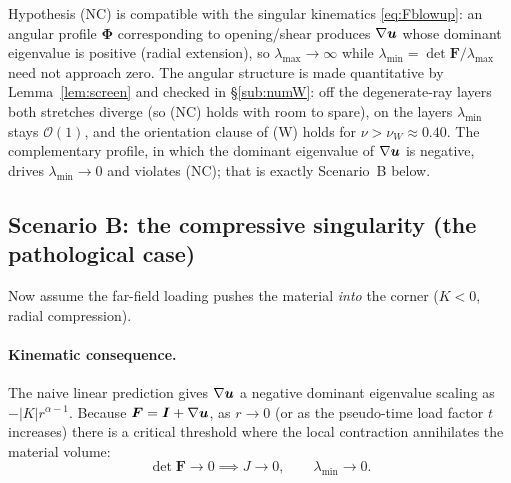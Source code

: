 \begin{remark}
    Hypothesis (NC) is compatible with the singular kinematics \eqref{eq:Fblowup}: an angular profile $\bm{\Phi}$
    corresponding to opening/shear produces $\nabla\bm{u}$ whose dominant eigenvalue is positive (radial extension), so
    $\lambda_{\max}\to\infty$ while $\lambda_{\min}=\det\bm{F}/\lambda_{\max}$ need not approach zero. The angular
    structure is made quantitative by Lemma~\ref{lem:screen} and checked in \S\ref{sub:numW}: off the degenerate-ray
    layers both stretches diverge (so (NC) holds with room to spare), on the layers $\lambda_{\min}$ stays
    $\mathcal{O}(1)$, and the orientation clause of (W) holds for $\nu>\nu_W\approx0.40$. The complementary
    profile, in which the dominant eigenvalue of $\nabla\bm{u}$ is negative, drives $\lambda_{\min}\to0$ and violates
    (NC); that is exactly Scenario~B below.
\end{remark}

\subsection{Scenario B: the compressive singularity (the pathological case)}
\label{sub:scenarioB}

Now assume the far-field loading pushes the material \emph{into} the corner ($K < 0$, radial compression).

\paragraph{Kinematic consequence.}
The naive linear prediction gives $\nabla\bm{u}$ a negative dominant eigenvalue scaling as $-|K| r^{\alpha-1}$. Because
$\bm{F} = \bm{I} + \nabla\bm{u}$, as $r \to 0$ (or as the pseudo-time load factor $t$ increases) there is a critical
threshold where the local contraction annihilates the material volume:
\begin{equation}
    \det \bm{F} \to 0 \implies J \to 0, \qquad \lambda_{\min} \to 0 .
\end{equation}

